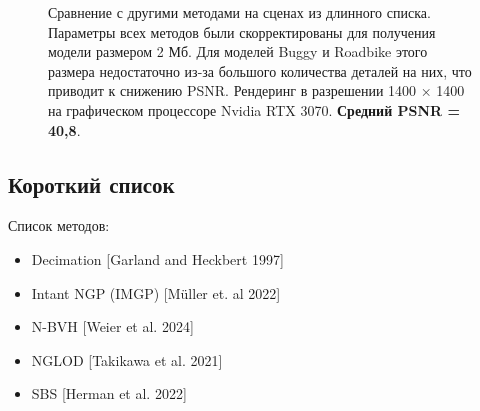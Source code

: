 \documentclass[a4paper,hidelinks,12pt]{article}
\begin{document}
\newpage

\begin{figure}[h]
  \centering
  \caption{Сравнение с другими методами на сценах из длинного списка. Параметры всех методов были 
	скорректированы для получения модели размером 2 Мб. Для моделей Buggy и Roadbike этого размера недостаточно 
	из-за большого количества деталей на них, что приводит к снижению PSNR. Рендеринг в разрешении 1400 × 1400 на 
	графическом процессоре Nvidia RTX 3070. \textbf{Средний PSNR = 40,8}.}
  \label{fig:my_label}
\end{figure}

\subsection{Короткий список}

Список методов:

\begin{itemize}
	\item Decimation [Garland and Heckbert 1997]
	\item Intant NGP (IMGP) [Müller et. al 2022]
	\item N-BVH [Weier et al. 2024]
	\item NGLOD [Takikawa et al. 2021]
	\item SBS [Herman et al. 2022]
\end{itemize}
\end{document}
